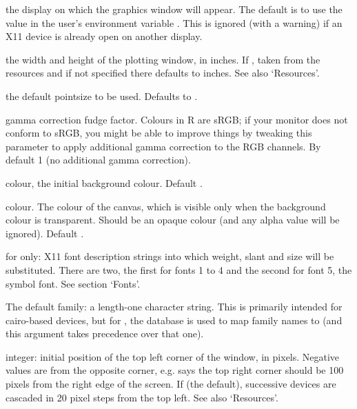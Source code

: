 \begin{Arguments}
\begin{ldescription}
\item[\code{display}] the display on which the graphics window will appear.
The default is to use the value in the user's environment variable
.  This is ignored (with a warning) if an X11 device is
already open on another display.

\item[\code{width, height}] the width and height of the plotting window, in
inches.  If , taken from the resources and if
not specified there defaults to  inches.  See also
`Resources'.

\item[\code{pointsize}] the default pointsize to be used.  Defaults to .

\item[\code{gamma}] gamma correction fudge factor.
Colours in R are sRGB;  if your monitor does not conform to
sRGB, you might be able to improve things by tweaking this
parameter to apply additional gamma correction to the RGB channels.
By default 1 (no additional gamma correction).

\item[\code{bg}] colour, the initial background colour.  Default
.

\item[\code{canvas}] colour.  The colour of the canvas, which is visible only
when the background colour is transparent.  Should be an opaque colour
(and any alpha value will be ignored).  Default .

\item[\code{fonts}] for  only:
X11 font description strings into which weight, slant and
size will be substituted.  There are two, the first for fonts 1 to 4
and the second for font 5, the symbol font.  See section `Fonts'.

\item[\code{family}] The default family: a length-one character string.  This
is primarily intended for cairo-based devices, but for , the  database is used to map family
names to  (and this argument takes precedence over that
one).

\item[\code{xpos, ypos}] integer: initial position of the top left corner of the
window, in pixels.  Negative values are from the opposite corner,
e.g.  says the top right corner should be 100 pixels
from the right edge of the screen.  If  (the default),
successive devices are cascaded in 20 pixel steps from the top left.
See also `Resources'.


\end{ldescription}
\end{Arguments}
